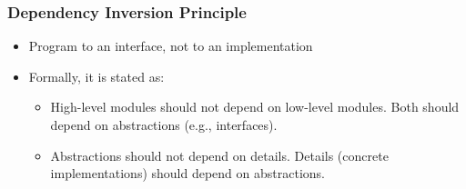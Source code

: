 \documentclass{article}
\begin{document}
\subsubsection{Dependency Inversion Principle}
\begin{itemize}
    \item Program to an interface, not to an implementation
    
    \item Formally, it is stated as:
    \begin{itemize}
        \item  High-level modules should not depend on low-level modules. Both should depend on abstractions (e.g., interfaces).
        
        \item Abstractions should not depend on details. Details (concrete implementations) should depend on abstractions.
    \end{itemize}
\end{itemize}
\end{document}
